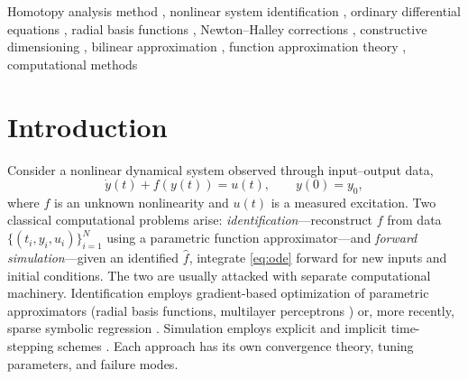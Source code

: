 \documentclass[preprint,12pt,numbers]{elsarticle}
\begin{document}
\begin{frontmatter}
\begin{abstract}
We validate the framework on benchmark problems: a one-dimensional discharge-flow
system (orifice-tank model), a two-dimensional Lotka-Volterra predator-prey
system, and robustness experiments under measurement noise. Gaussian RBF and
sigmoid MLP approximators identified from sparse data (20--40 points) attain
identification residuals from $3\cdot 10^{-2}$ (RBF) down to machine precision
($1.7\cdot 10^{-8}$, MLP) in a single outer iteration and yield forward-simulation
errors of at most 2.3\% over 200-step horizons on the 1D benchmark. The scope of the empirical validation is
deliberately narrow---low-dimensional ODEs, small-scale approximators---and the
role of the present work is to establish the algorithmic framework, the
dimensioning theory, and the proof-of-concept computational regime; broader
empirical assessment and extension to high-dimensional or stiff systems are
identified as follow-up work.
\end{abstract}

\begin{keyword}
Homotopy analysis method \sep
nonlinear system identification \sep
ordinary differential equations \sep
radial basis functions \sep
Newton--Halley corrections \sep
constructive dimensioning \sep
bilinear approximation \sep
function approximation theory \sep
computational methods
\end{keyword}

\end{frontmatter}

\linenumbers

\section{Introduction}
\label{sec:intro}

Consider a nonlinear dynamical system observed through input--output data,
\begin{equation}
\dot{y}(t) + f(y(t)) = u(t), \qquad y(0) = y_0,
\label{eq:ode}
\end{equation}
where $f$ is an unknown nonlinearity and $u(t)$ is a measured excitation.
Two classical computational problems arise: \emph{identification}---reconstruct
$f$ from data $\{(t_i, y_i, u_i)\}_{i=1}^{N}$ using a parametric function
approximator---and \emph{forward simulation}---given an identified $\hat{f}$,
integrate \eqref{eq:ode} forward for new inputs and initial conditions. The two
are usually attacked with separate computational machinery. Identification employs
gradient-based optimization of parametric approximators (radial basis functions,
multilayer perceptrons \cite{Haykin2009,Park1991,Sjoberg1995,Nelles2001}) or,
more recently, sparse symbolic regression \cite{BruntonProctorKutz2016,Champion2019}.
Simulation employs explicit and implicit time-stepping schemes
\cite{Hairer1993,Butcher2016}. Each approach has its own convergence theory,
tuning parameters, and failure modes.
\end{document}
